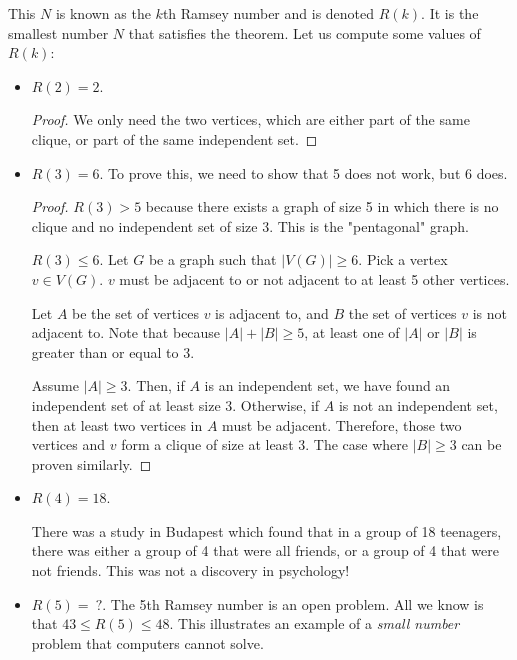 \documentclass[a4paper]{article}
\begin{document}
This \( N \) is known as the \( k \)th Ramsey number and is denoted \( R(k) \). It is the smallest number \( N \) that satisfies the theorem. Let us compute some values of \( R(k) \):
\begin{itemize}
	\item \( R(2)=2 \).
		\begin{proof}
			We only need the two vertices, which are either part of the same clique, or part of the same independent set.
		\end{proof}
	\item \( R(3)=6 \). To prove this, we need to show that 5 does not work, but 6 does.
		\begin{proof}
			\( R(3)>5 \) because there exists a graph of size 5 in which there is no clique and no independent set of size 3. This is the "pentagonal" graph. \par
			\( R(3) \le 6 \). Let \( G \) be a graph such that \( |V(G)| \ge 6 \). Pick a vertex \( v \in  V(G) \). \( v \) must be adjacent to or not adjacent to at least 5 other vertices. \par
			Let \( A \) be the set of vertices \( v \) is adjacent to, and \( B \) the set of vertices \( v \) is not adjacent to. Note that because \( |A| + |B| \ge 5 \), at least one of \( |A| \) or \( |B| \) is greater than or equal to 3. \par
			Assume \( |A| \ge 3 \). Then, if \( A \) is an independent set, we have found an independent set of at least size \( 3 \). Otherwise, if \( A \) is not an independent set, then at least two vertices in \( A \) must be adjacent. Therefore, those two vertices and \( v \) form a clique of size at least 3. The case where \( |B| \ge 3 \) can be proven similarly.
		\end{proof}
	\item \( R(4) = 18 \).
		\begin{note}
			There was a study in Budapest which found that in a group of 18 teenagers, there was either a group of 4 that were all friends, or a group of 4 that were not friends. This was not a discovery in psychology!
		\end{note}
	\item \( R(5) = ~? \). The 5th Ramsey number is an open problem. All we know is that \( 43 \le  R(5) \le 48 \). This illustrates an example of a \textit{small number} problem that computers cannot solve.
\end{itemize}

\end{document}
